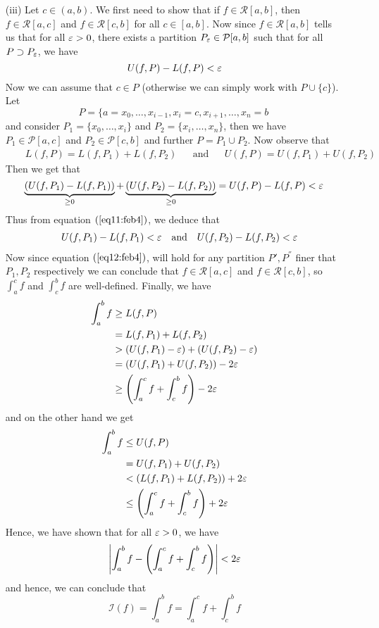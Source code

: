 \begin{prf}
\begin{enumerate}
    \item[(iii)] Let $c \in (a,b)$. We first need to show that if $f \in \mathcal{R}[a,b]$, then $f \in \mathcal{R}[a,c]$ and $f \in \mathcal{R}[c,b]$ for all $c \in [a,b]$. Now since $f \in \mathcal{R}[a,b]$  tells us that for all $\varepsilon > 0$, there exists a partition $P_{\varepsilon} \in \mathcal{P}[a,b]$ such that for all $P \supset P_{\varepsilon}$, we have 
    \[
        U(f,P) - L(f,P) < \varepsilon    
    \] 
    Now \gen we can assume that $c \in P$ (otherwise we can simply work with $P \cup \{c\}$). Let \[P = \{a = x_0, \dots, x_{i-1}, x_i = c, x_{i+1}, \dots, x_n = b\ \] and consider $P_1 = \{x_0,\dots,x_i\}$ and $P_2 = \{x_i,\dots,x_n\}$, then we have $P_1 \in \mathcal{P}[a,c]$ and $P_2 \in \mathcal{P}[c,b]$ and further $P = P_1 \cup P_2 $. Now observe that 
    \begin{align*}
        &&L(f,P) = L(f,P_1) + L(f,P_2) &&\mbox{and} &&U(f,P) = U(f,P_1) + U(f,P_2)
    \end{align*}
    Then we get that 
    \begin{equation}\label{eq11:feb4}
        \underbrace{(U(f,P_1) - L(f,P_1))}_{\geq 0} + \underbrace{(U(f,P_2) - L(f,P_2))}_{\geq 0} = U(f,P) - L(f,P) < \varepsilon
    \end{equation}
    Thus from equation $(\ref{eq11:feb4})$, we deduce that 
    \begin{align}\label{eq12:feb4}
        &&U(f,P_1) - L(f,P_1) < \varepsilon &&\mbox{and} &&U(f,P_2) - L(f,P_2) < \varepsilon
    \end{align}
    Now since equation $(\ref{eq12:feb4})$, will hold for any partition $P', P^{''}$ finer that $P_1, P_2$ respectively we can conclude that $f \in \mathcal{R}[a,c]$ and $f \in \mathcal{R}[c,b]$, so $\int_a^c f $ and $\int_c^b f$ are well-defined. Finally, we have 
    \begin{align*}
        \int_a^b f &\geq L(f,P) \\ 
                   &= L(f,P_1) + L(f,P_2) \\ 
                   &> (U(f,P_1)-\varepsilon) + (U(f,P_2)-\varepsilon) \\ 
                   &= (U(f,P_1)+U(f,P_2)) - 2\varepsilon \\ 
                   &\geq \left(\int_a^c f + \int_c^b f \right) - 2\varepsilon
    \end{align*}
    and on the other hand we get 
    \begin{align*}
        \int_a^b f &\leq U(f,P) \\ 
                   &= U(f,P_1) + U(f,P_2) \\ 
                   &< (L(f,P_1)+L(f,P_2)) + 2\varepsilon \\ 
                   &\leq \left( \int_a^c f + \int_c^b f \right) + 2\varepsilon
    \end{align*}
    Hence, we have shown that for all $\varepsilon > 0$, we have  
    \[
        \left| \int_a^b f - \left( \int_a^c f + \int_c^b f\right) \right| < 2\varepsilon
    \]  
    and hence, we can conclude that 
    \[ 
        \mathcal{I}(f) = \int_a^b f = \int_a^c f + \int_c^b f    
    \]
\end{enumerate}
\end{prf}